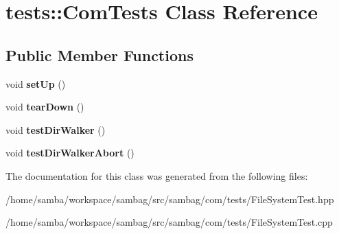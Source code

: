 \hypertarget{classtests_1_1_com_tests}{
\section{tests::ComTests Class Reference}
\label{classtests_1_1_com_tests}
}
\subsection*{Public Member Functions}
\begin{DoxyCompactItemize}
\item 
\hypertarget{classtests_1_1_com_tests_a076ae7be2c82946ea1f0893e8a4f7792}{
void {\bfseries setUp} ()}
\label{classtests_1_1_com_tests_a076ae7be2c82946ea1f0893e8a4f7792}

\item 
\hypertarget{classtests_1_1_com_tests_a4fa483294bab43ea2a457c7d3c46e5c3}{
void {\bfseries tearDown} ()}
\label{classtests_1_1_com_tests_a4fa483294bab43ea2a457c7d3c46e5c3}

\item 
\hypertarget{classtests_1_1_com_tests_a7d5d17aef7b91e37fcded9c5a67b9ae8}{
void {\bfseries testDirWalker} ()}
\label{classtests_1_1_com_tests_a7d5d17aef7b91e37fcded9c5a67b9ae8}

\item 
\hypertarget{classtests_1_1_com_tests_a1d2bd7ec84a408731569f2a5007a33fd}{
void {\bfseries testDirWalkerAbort} ()}
\label{classtests_1_1_com_tests_a1d2bd7ec84a408731569f2a5007a33fd}

\end{DoxyCompactItemize}


The documentation for this class was generated from the following files:\begin{DoxyCompactItemize}
\item 
/home/samba/workspace/sambag/src/sambag/com/tests/FileSystemTest.hpp\item 
/home/samba/workspace/sambag/src/sambag/com/tests/FileSystemTest.cpp\end{DoxyCompactItemize}

